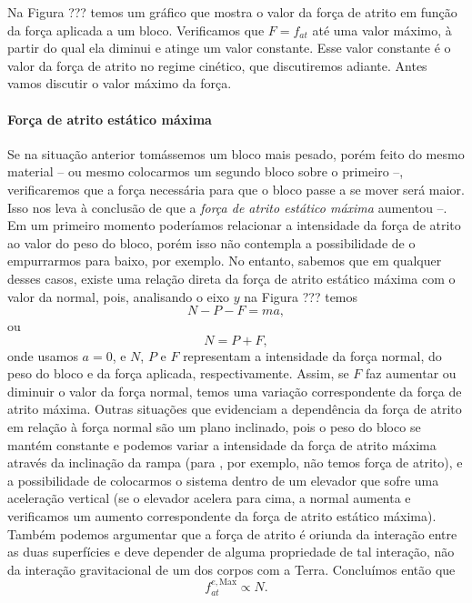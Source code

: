 Na Figura ??? temos um gráfico que mostra o valor da força de atrito em função da força aplicada a um bloco. Verificamos que $F = f_{at}$ até uma valor máximo, à partir do qual ela diminui e atinge um valor constante. Esse valor constante é o valor da força de atrito no regime cinético, que discutiremos adiante. Antes vamos discutir o valor máximo da força.

\paragraph{Força de atrito estático máxima} 


Se na situação anterior tomássemos um bloco mais pesado, porém feito do mesmo material -- ou mesmo colocarmos um segundo bloco sobre o primeiro --, verificaremos que a força necessária para que o bloco passe a se mover será maior. Isso nos leva à conclusão de que a \emph{força de atrito estático máxima} aumentou --. Em um primeiro momento poderíamos relacionar a intensidade da força de atrito ao valor do peso do bloco, porém isso não contempla a possibilidade de o empurrarmos para baixo, por exemplo. No entanto, sabemos que em qualquer desses casos, existe uma relação direta da força de atrito estático máxima com o valor da normal, pois, analisando o eixo $y$ na Figura ??? temos
\begin{equation}
  N - P - F = ma,
\end{equation}
%
ou
\begin{equation}
  N = P + F,
\end{equation}
onde usamos $a = 0$, e $N$, $P$ e $F$ representam a intensidade da força normal,  do peso do bloco e da força aplicada, respectivamente. Assim, se $F$ faz aumentar ou diminuir o valor da força normal, temos uma variação correspondente da força de atrito máxima. Outras situações que evidenciam a dependência da força de atrito em relação à força normal são um plano inclinado, pois o peso do bloco se mantém constante e podemos variar a intensidade da força de atrito máxima através da inclinação da rampa (para , por exemplo, não temos força de atrito), e a possibilidade de colocarmos o sistema dentro de um elevador que sofre uma aceleração vertical (se o elevador acelera para cima, a normal aumenta e verificamos um aumento correspondente da força de atrito estático máxima). Também podemos argumentar que a força de atrito é oriunda da interação entre as duas superfícies e deve depender de alguma propriedade de tal interação, não da interação gravitacional de um dos corpos com a Terra. Concluímos então que
\begin{equation}
  f_{at}^{e, \textrm{Max}} \propto N.
\end{equation}

